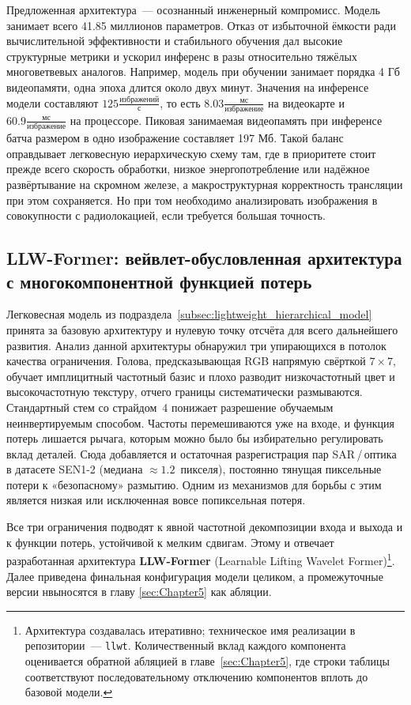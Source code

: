 Предложенная архитектура~--- осознанный инженерный компромисс.
Модель занимает всего 41.85 миллионов параметров.
Отказ от избыточной ёмкости ради вычислительной эффективности и стабильного обучения дал высокие структурные метрики и ускорил инференс в разы относительно тяжёлых многоветвевых аналогов.
Например, модель при обучении занимает порядка 4 Гб видеопамяти, одна эпоха длится около двух минут.
Значения на инференсе модели составляют $125 \frac{\text{избражений}}{\text{с}}$, то есть $8.03 \frac{\text{мс}}{\text{избражение}}$ на видеокарте и $60.9 \frac{\text{мс}}{\text{избражение}}$ на процессоре. Пиковая занимаемая видеопамять при инференсе батча размером в одно изображение составляет 197 Мб.
Такой баланс оправдывает легковесную иерархическую схему там, где в приоритете стоит прежде всего скорость обработки, низкое энергопотребление или надёжное развёртывание на скромном железе, а макроструктурная корректность трансляции при этом сохраняется.
Но при том необходимо анализировать изображения в совокупности с радиолокацией, если требуется большая точность.

\subsection{LLW-Former: вейвлет-обусловленная архитектура с многокомпонентной функцией потерь}
\label{subsec:llwformer}

Легковесная модель из подраздела~\ref{subsec:lightweight_hierarchical_model} принята за базовую архитектуру и нулевую точку отсчёта для всего дальнейшего развития.
Анализ данной архитектуры обнаружил три упирающихся в потолок качества ограничения.
Голова, предсказывающая RGB напрямую свёрткой $7{\times}7$, обучает имплицитный частотный базис и плохо разводит низкочастотный цвет и высокочастотную текстуру, отчего границы систематически размываются.
Стандартный стем со страйдом~4 понижает разрешение обучаемым неинвертируемым способом.
Частоты перемешиваются уже на входе, и функция потерь лишается рычага, которым можно было бы избирательно регулировать вклад деталей.
Сюда добавляется и остаточная разрегистрация пар SAR\,/\,оптика в датасете SEN1-2 (медиана $\approx 1.2$~пикселя), постоянно тянущая пиксельные потери к «безопасному» размытию.
Одним из механизмов для борьбы с этим является низкая или исключенная вовсе попиксельная потеря.

Все три ограничения подводят к явной частотной декомпозиции
входа и выхода и к функции потерь, устойчивой к мелким сдвигам. Этому и отвечает
разработанная архитектура \textbf{LLW-Former} (Learnable Lifting Wavelet
Former)\footnote{Архитектура создавалась итеративно; техническое имя реализации
в репозитории~--- \texttt{llwt}. Количественный вклад каждого компонента
оценивается обратной абляцией в главе~\ref{sec:Chapter5}, где строки таблицы
соответствуют последовательному отключению компонентов вплоть до базовой модели.}.
Далее приведена финальная конфигурация модели целиком, а промежуточные версии
нвыносятся в главу \ref{sec:Chapter5} как абляции.


